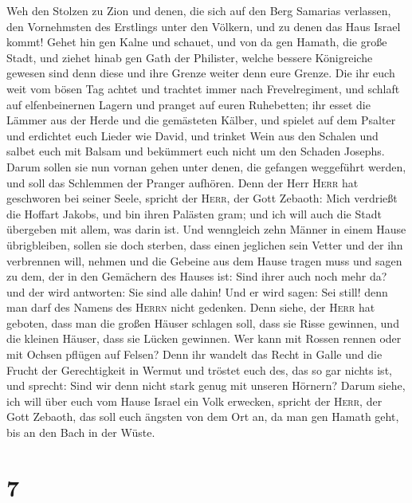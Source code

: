  Weh den Stolzen zu Zion und denen, die sich auf den Berg
Samarias verlassen, den Vornehmsten des Erstlings unter den Völkern, und
zu denen das Haus Israel kommt!  Gehet hin gen Kalne und
schauet, und von da gen Hamath, die große Stadt, und ziehet hinab gen
Gath der Philister, welche bessere Königreiche gewesen sind denn diese
und ihre Grenze weiter denn eure Grenze.  Die ihr euch
weit vom bösen Tag achtet und trachtet immer nach Frevelregiment,
 und schlaft auf elfenbeinernen Lagern und pranget auf
euren Ruhebetten; ihr esset die Lämmer aus der Herde und die gemästeten
Kälber,  und spielet auf dem Psalter und erdichtet euch
Lieder wie David,  und trinket Wein aus den Schalen und
salbet euch mit Balsam und bekümmert euch nicht um den Schaden Josephs.
 Darum sollen sie nun vornan gehen unter denen, die
gefangen weggeführt werden, und soll das Schlemmen der Pranger aufhören.
 Denn der Herr \textsc{Herr} hat geschworen bei seiner
Seele, spricht der \textsc{Herr}, der Gott Zebaoth: Mich verdrießt die
Hoffart Jakobs, und bin ihren Palästen gram; und ich will auch die Stadt
übergeben mit allem, was darin ist.  Und wenngleich zehn
Männer in einem Hause übrigbleiben, sollen sie doch sterben,
 dass einen jeglichen sein Vetter und der ihn verbrennen
will, nehmen und die Gebeine aus dem Hause tragen muss und sagen zu dem,
der in den Gemächern des Hauses ist: Sind ihrer auch noch mehr da? und
der wird antworten: Sie sind alle dahin! Und er wird sagen: Sei still!
denn man darf des Namens des \textsc{Herrn} nicht gedenken.
 Denn siehe, der \textsc{Herr} hat geboten, dass man die
großen Häuser schlagen soll, dass sie Risse gewinnen, und die kleinen
Häuser, dass sie Lücken gewinnen.  Wer kann mit Rossen
rennen oder mit Ochsen pflügen auf Felsen? Denn ihr wandelt das Recht in
Galle und die Frucht der Gerechtigkeit in Wermut  und
tröstet euch des, das so gar nichts ist, und sprecht: Sind wir denn
nicht stark genug mit unseren Hörnern?  Darum siehe, ich
will über euch vom Hause Israel ein Volk erwecken, spricht der
\textsc{Herr}, der Gott Zebaoth, das soll euch ängsten von dem Ort an,
da man gen Hamath geht, bis an den Bach in der Wüste.

\hypertarget{section-6}{%
\section{7}\label{section-6}}


